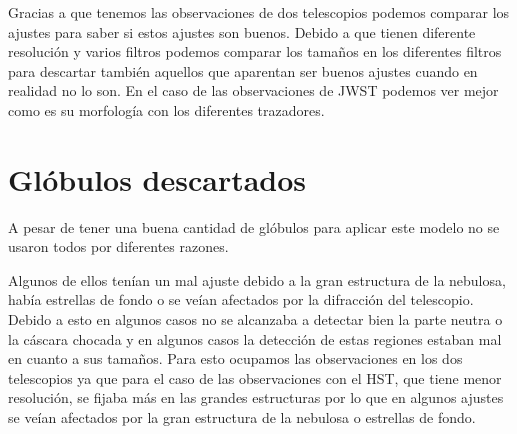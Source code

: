 \documentclass{book}
\begin{document}
Gracias a que tenemos las observaciones de dos telescopios podemos comparar los ajustes para saber si estos ajustes son buenos. Debido a que tienen diferente resolución y varios filtros podemos comparar los tamaños en los diferentes filtros para descartar también aquellos que aparentan ser buenos ajustes cuando en realidad no lo son. En el caso de las observaciones de JWST podemos ver mejor como es su morfología con los diferentes trazadores.

\section{Glóbulos descartados}\label{Bad globules}

A pesar de tener una buena cantidad de glóbulos para aplicar este modelo no se usaron todos por diferentes razones. 

Algunos de ellos tenían un mal ajuste debido a la gran estructura de la nebulosa, había estrellas de fondo o se veían afectados por la difracción del telescopio.  Debido a esto en algunos casos no se alcanzaba a detectar bien la parte neutra o la cáscara chocada y en algunos casos la detección de estas regiones estaban mal en cuanto a sus tamaños.  Para esto ocupamos las observaciones en los dos telescopios ya que para el caso de las observaciones con el HST, que tiene menor resolución, se fijaba más en las grandes estructuras por lo que en algunos ajustes se veían afectados por la gran estructura de la nebulosa o estrellas de fondo.
\end{document}
